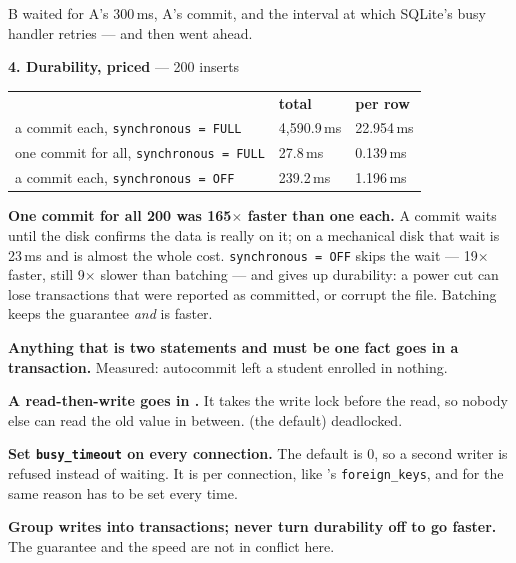\begin{measured}
\smallskip
B waited for A's 300\,ms, A's commit, and the interval at which SQLite's busy
handler retries --- and then went ahead.

\medskip
\textbf{4. Durability, priced} --- 200 inserts

\begin{tabular}{@{}L{7.4cm}R{2.8cm}R{2.8cm}@{}}
& \textbf{total} & \textbf{per row} \\
a commit each, \texttt{synchronous = FULL} & 4{,}590.9\,ms & 22.954\,ms \\
one commit for all, \texttt{synchronous = FULL} & 27.8\,ms & 0.139\,ms \\
a commit each, \texttt{synchronous = OFF} & 239.2\,ms & 1.196\,ms \\
\end{tabular}

\smallskip
\textbf{One commit for all 200 was 165$\times$ faster than one each.} A commit
waits until the disk confirms the data is really on it; on a mechanical disk
that wait is 23\,ms and is almost the whole cost. \texttt{synchronous = OFF}
skips the wait --- 19$\times$ faster, still 9$\times$ slower than batching ---
and gives up durability: a power cut can lose transactions that were reported
as committed, or corrupt the file. Batching keeps the guarantee \emph{and} is
faster.
\end{measured}

\begin{alertbox}
\begin{tight}
  \item \textbf{Anything that is two statements and must be one fact goes in a
        transaction.} Measured: autocommit left a student enrolled in nothing.
  \item \textbf{A read-then-write goes in .} It takes
        the write lock before the read, so nobody else can read the old value
        in between.  (the default) deadlocked.
  \item \textbf{Set \texttt{busy\_timeout} on every connection.} The default
        is 0, so a second writer is refused instead of waiting. It is per
        connection, like 's \texttt{foreign\_keys}, and for
        the same reason has to be set every time.
  \item \textbf{Group writes into transactions; never turn durability off to
        go faster.} The guarantee and the speed are not in conflict here.
\end{tight}
\end{alertbox}

